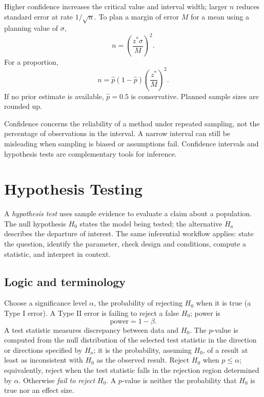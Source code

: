 \documentclass[11pt]{article}
\begin{document}
Higher confidence increases the critical value and interval width; larger
$n$ reduces standard error at rate $1/\sqrt n$.  To plan a margin of error
$M$ for a mean using a planning value of $\sigma$,
\begin{equation}\label{eq:n-mean}
n=\left(\frac{z^*\sigma}{M}\right)^2.
\end{equation}
For a proportion,
\begin{equation}\label{eq:n-prop}
n=\widehat p(1-\widehat p)\left(\frac{z^*}{M}\right)^2.
\end{equation}
If no prior estimate is available, $\widehat p=0.5$ is conservative.  Planned
sample sizes are rounded up.

\begin{keybox}
Confidence concerns the reliability of a method under repeated sampling, not
the percentage of observations in the interval.  A narrow interval can still
be misleading when sampling is biased or assumptions fail.  Confidence
intervals and hypothesis tests are complementary tools for inference.
\end{keybox}

\section{Hypothesis Testing}\label{sec:testing}
A \emph{hypothesis test} uses sample evidence to evaluate a claim about a
population.  The null hypothesis $H_0$ states the model being tested; the
alternative $H_a$ describes the departure of interest.  The same inferential
workflow applies: state the question, identify the parameter, check design
and conditions, compute a statistic, and interpret in context.

\subsection{Logic and terminology}
Choose a significance level $\alpha$, the probability of rejecting $H_0$ when
it is true (a Type I error).  A Type II error is failing to reject a false
$H_0$; power is
\begin{equation}\label{eq:power}
\text{power}=1-\beta.
\end{equation}
A test statistic measures discrepancy between data and $H_0$.  The $p$-value
is computed from the null distribution of the selected test statistic in the
direction or directions specified by $H_a$; it is the probability, assuming
$H_0$, of a result at least as inconsistent with $H_0$ as the observed
result.  Reject $H_0$ when $p\le\alpha$; equivalently, reject when the test
statistic falls in the rejection region determined by $\alpha$.  Otherwise
\emph{fail to reject} $H_0$.  A $p$-value is neither the probability that
$H_0$ is true nor an effect size.
\end{document}

